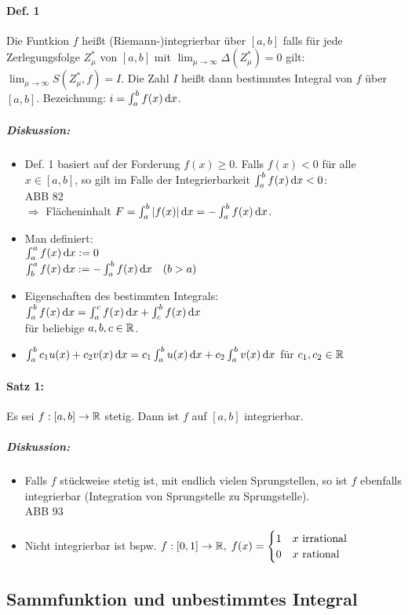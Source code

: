 \paragraph{Def. 1} Die Funtkion $f$ heißt (Riemann-)integrierbar über $[a,b]$ falls für jede Zerlegungsfolge $Z^*_\mu$ von $[a,b]$ mit $\lim_{\mu\to \infty}\Delta (Z^*_\mu)=0$ gilt: $\lim_{\mu\to\infty}S(Z^*_\mu, f) = I$. Die Zahl $I$ heißt dann bestimmtes Integral von $f$ über $[a,b]$. Bezeichnung: $i=\int_a^bf(x)\,\mathrm{d}x$.
\subparagraph{Diskussion:}
\begin{itemize}
\item Def. 1 basiert auf der Forderung $f(x)\geq 0$. Falls $f(x)<0$ für alle $x\in [a,b]$, so gilt im Falle der Integrierbarkeit $\int_a^bf(x)\,\mathrm{d}x<0$:\\
ABB 82\\
$\Rightarrow$ Flächeninhalt $F=\int_a^b|f(x)|\,\mathrm{d}x=-\int_a^bf(x)\,\mathrm{d}x$.
\item Man definiert:\\
$\int_a^af(x)\,\mathrm{d}x:=0$\\
$\int_b^af(x)\,\mathrm{d}x:= - \int_a^bf(x)\,\mathrm{d}x \quad (b>a)$
\item Eigenschaften des bestimmten Integrals:\\
$\int_a^bf(x)\,\mathrm{d}x=\int_a^cf(x)\,\mathrm{d}x+\int_c^bf(x)\,\mathrm{d}x$\\
für beliebige $a, b, c \in \mathbb{R}$.
\item $\int_a^bc_1 u(x) + c_2 v(x) \,\mathrm{d}x = c_1 \int_a^bu(x)\,\mathrm{d}x+c_2 \int_a^b v(x) \,\mathrm{d}x$ für $c_1, c_2 \in \mathbb{R}$
\end{itemize}
\paragraph{Satz 1:} Es sei $f: [a,b] \to \mathbb{R}$ stetig. Dann ist $f$ auf $[a,b]$ integrierbar. 
\subparagraph{Diskussion:} 
\begin{itemize}
\item Falls $f$ stückweise stetig ist, mit endlich vielen Sprungstellen, so ist $f$ ebenfalls integrierbar (Integration von Sprungstelle zu Sprungstelle).\\
ABB 93
\item Nicht integrierbar ist bspw. $f: [0,1] \to \mathbb{R}, \; f(x) = \begin{cases}
1 & x \text{ irrational}\\
0 & x \text{ rational}
\end{cases}$
\end{itemize}
\subsection{Sammfunktion und unbestimmtes Integral}

